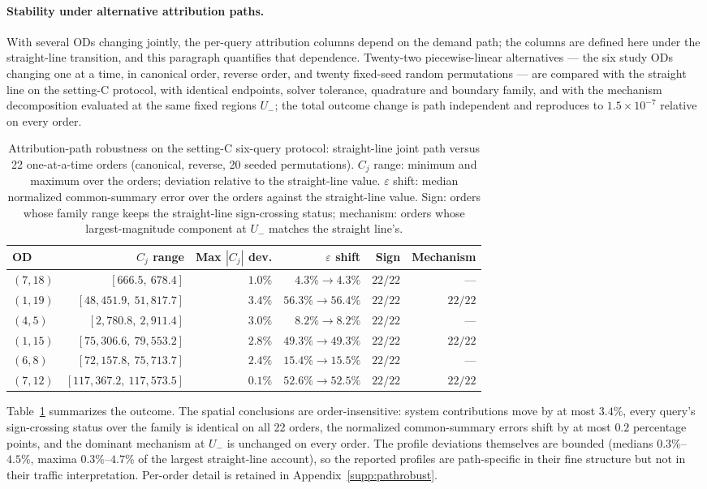 \paragraph{Stability under alternative attribution paths.}\label{subsec:pathrobust}
With several ODs changing jointly, the per-query attribution columns
depend on the demand path; the columns are defined here under the
straight-line transition, and this paragraph quantifies that
dependence. Twenty-two piecewise-linear alternatives --- the six study
ODs changing one at a time, in canonical order, reverse order, and
twenty fixed-seed random permutations --- are compared with the
straight line on the setting-C protocol, with identical endpoints,
solver tolerance, quadrature and boundary family, and with the
mechanism decomposition evaluated at the same fixed regions $U_-$; the
total outcome change is path independent and reproduces to
$1.5\times10^{-7}$ relative on every order.
\begin{table}[t]\centering\footnotesize
\caption{Attribution-path robustness on the setting-C six-query
protocol: straight-line joint path versus 22 one-at-a-time orders
(canonical, reverse, 20 seeded permutations). $C_j$ range: minimum and
maximum over the orders; deviation relative to the straight-line
value. $\varepsilon$ shift: median normalized common-summary error
over the orders against the straight-line value. Sign: orders whose
family range keeps the straight-line sign-crossing status; mechanism:
orders whose largest-magnitude component at $U_-$ matches the straight
line's.}\label{tab:pathrobust}
\begin{tabular}{lrrrrr}\toprule
OD & $C_j$ range & Max $|C_j|$ dev. & $\varepsilon$ shift & Sign & Mechanism\\\midrule
$(7,18)$ & $[666.5,\ 678.4]$ & $1.0\%$ & $4.3\%\to4.3\%$ & $22/22$ & ---\\
$(1,19)$ & $[48{,}451.9,\ 51{,}817.7]$ & $3.4\%$ & $56.3\%\to56.4\%$ & $22/22$ & $22/22$\\
$(4,5)$ & $[2{,}780.8,\ 2{,}911.4]$ & $3.0\%$ & $8.2\%\to8.2\%$ & $22/22$ & ---\\
$(1,15)$ & $[75{,}306.6,\ 79{,}553.2]$ & $2.8\%$ & $49.3\%\to49.3\%$ & $22/22$ & $22/22$\\
$(6,8)$ & $[72{,}157.8,\ 75{,}713.7]$ & $2.4\%$ & $15.4\%\to15.5\%$ & $22/22$ & ---\\
$(7,12)$ & $[117{,}367.2,\ 117{,}573.5]$ & $0.1\%$ & $52.6\%\to52.5\%$ & $22/22$ & $22/22$\\
\bottomrule\end{tabular}\end{table}
Table~\ref{tab:pathrobust} summarizes the outcome. The spatial
conclusions are order-insensitive: system contributions move by at most
$3.4\%$, every query's sign-crossing status over the family is
identical on all 22 orders, the normalized common-summary errors shift
by at most $0.2$ percentage points, and the dominant mechanism at $U_-$
is unchanged on every order. The profile deviations themselves are
bounded (medians $0.3\%$--$4.5\%$, maxima $0.3\%$--$4.7\%$ of the
largest straight-line account), so the reported profiles are
path-specific in their fine structure but not in their traffic
interpretation. Per-order detail is retained in
Appendix~\ref{supp:pathrobust}.
